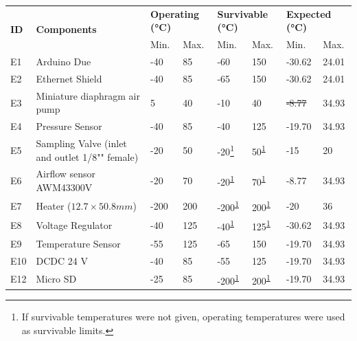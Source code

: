 \documentclass[a4paper,12pt,twoside]{article}
\providecommand{\DIFaddtex}[1]{{\protect\color{blue}\uwave{#1}}} %
\providecommand{\DIFdeltex}[1]{{\protect\color{red}\sout{#1}}}                      %
\providecommand{\DIFaddbegin}{} %
\providecommand{\DIFaddend}{} %
\providecommand{\DIFdelbegin}{} %
\providecommand{\DIFdelend}{} %
\providecommand{\DIFadd}[1]{\texorpdfstring{\DIFaddtex{#1}}{#1}} %
\providecommand{\DIFdel}[1]{\texorpdfstring{\DIFdeltex{#1}}{}} %
\newcommand{\DIFscaledelfig}{0.5}
\newlength{\DIFdelgraphicswidth} %
\newlength{\DIFdelgraphicsheight} %
\newcommand{\DIFaddincludegraphics}[2][]{{\color{blue}\fbox{\DIFOincludegraphics[#1]{#2}}}} %
\newcommand{\DIFdelincludegraphics}[2][]{%
\sbox{\DIFdelgraphicsbox}{\DIFOincludegraphics[#1]{#2}}%
\settoboxwidth{\DIFdelgraphicswidth}{\DIFdelgraphicsbox} %
\settoboxtotalheight{\DIFdelgraphicsheight}{\DIFdelgraphicsbox} %
\scalebox{\DIFscaledelfig}{%
\parbox[b]{\DIFdelgraphicswidth}{\usebox{\DIFdelgraphicsbox}\\[-\baselineskip] \rule{\DIFdelgraphicswidth}{0em}}\llap{\resizebox{\DIFdelgraphicswidth}{\DIFdelgraphicsheight}{%
\setlength{\unitlength}{\DIFdelgraphicswidth}%
\begin{picture}(1,1)%
\thicklines\linethickness{2pt} %
{\color[rgb]{1,0,0}\put(0,0){\framebox(1,1){}}}%
{\color[rgb]{1,0,0}\put(0,0){\line( 1,1){1}}}%
{\color[rgb]{1,0,0}\put(0,1){\line(1,-1){1}}}%
\end{picture}%
}\hspace*{3pt}}} %
} %
\DeclareRobustCommand{\DIFaddbegin}{\DIFOaddbegin \let\includegraphics\DIFaddincludegraphics} %
\DeclareRobustCommand{\DIFaddend}{\DIFOaddend \let\includegraphics\DIFOincludegraphics} %
\DeclareRobustCommand{\DIFdelbegin}{\DIFOdelbegin \let\includegraphics\DIFdelincludegraphics} %
\DeclareRobustCommand{\DIFdelend}{\DIFOaddend \let\includegraphics\DIFOincludegraphics} %
\begin{document}
\begin{longtable}{|m{1cm}|m{3.5cm}|m{1.3cm}|m{1.3cm}|m{1.4cm}|m{1.3cm}|m{1.3cm}|m{1.3cm}|}
\hline
\multirow{2}{*}{\textbf{ID}} & \multirow{2}{*}{\textbf{Components}}                                 & \multicolumn{2}{l|}{\textbf{Operating (°C)}} & \multicolumn{2}{l|}{\textbf{Survivable (°C)}} & \multicolumn{2}{l|}{\textbf{Expected (°C)}} \\ \cline{3-8} &   & Min.  & Max.  & Min.  & Max.  &  Min.   &  Max.            \\ \hline
E1 & Arduino Due & -40 & 85 & -60 & 150 & -30.62 & 24.01 \\ \hline
E2 & Ethernet Shield & -40 & 85 & -65 & 150 & -30.62 & 24.01 \\ \hline
E3 & Miniature diaphragm air pump & 5 & 40 & -10 & 40 & \DIFdelbegin \DIFdel{-8.77 }\DIFdelend \DIFaddbegin \DIFadd{10 }\DIFaddend & 34.93 \\ \hline
E4 & Pressure Sensor & -40 & 85 & -40 & 125 & -19.70 & 34.93 \\ \hline
E5 & Sampling Valve (inlet and outlet 1/8"" female) & -20 & 50 & -20\footnote{If survivable temperatures were not given, operating temperatures were used as survivable limits.\label{fn:erik}} & 50\textsuperscript{\ref{fn:erik}} & -15 & 20 \\ \hline
E6 & Airflow sensor AWM43300V & -20 & 70 & -20\textsuperscript{\ref{fn:erik}} & 70\textsuperscript{\ref{fn:erik}} & -8.77 & 34.93 \\ \hline
E7 & Heater ($12.7\times 50.8 mm$) & -200 & 200 & -200\textsuperscript{\ref{fn:erik}} & 200\textsuperscript{\ref{fn:erik}} & -20 & 36 \\ \hline
E8 & Voltage Regulator & -40 & 125 & -40\textsuperscript{\ref{fn:erik}} & 125\textsuperscript{\ref{fn:erik}} & -30.62 & 34.93 \\ \hline
E9 & Temperature Sensor & -55 & 125 & -65 & 150 & -19.70 & 34.93 \\ \hline
E10 & DCDC 24 V & -40 & 85 & -55 & 125 & -19.70 & 34.93 \\ \hline
E12 & Micro SD & -25 & 85 & -200\textsuperscript{\ref{fn:erik}} & 200\textsuperscript{\ref{fn:erik}} & -19.70 & 34.93 \\ \hline

\end{longtable}
\end{document}
